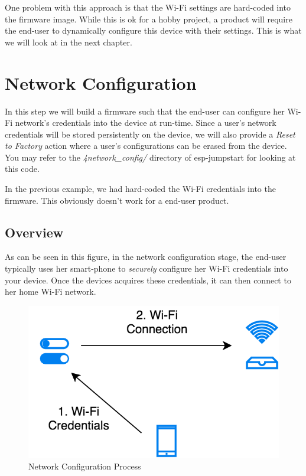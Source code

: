 \documentclass[11pt,fleqn]{book} %
\begin{document}
One problem with this approach is that the Wi-Fi settings are hard-coded into the firmware image. While this is ok for a hobby project, a product will require the end-user to dynamically configure this device with their settings. This is what we will look at in the next chapter.



\chapter{Network Configuration}

In this step we will build a firmware such that the end-user can configure her Wi-Fi network's credentials into the device at run-time. Since a user's network credentials will be stored persistently on the device, we will also provide a \textit{Reset to Factory} action where a user's configurations can be erased from the device.
You may refer to the \textit{4network\_config/} directory of esp-jumpstart for looking at this code.

In the previous example, we had hard-coded the Wi-Fi credentials into the firmware. This obviously doesn't work for a end-user product.

\section{Overview}
As can be seen in this figure, in the network configuration stage, the end-user typically uses her smart-phone to \textit{securely} configure her Wi-Fi credentials into your device. Once the devices acquires these credentials, it can then connect to her home Wi-Fi network. 

\begin{figure}
    \centering
    \includegraphics[scale=0.4]{Pictures/network_config.png}
    \caption{Network Configuration Process}
    \label{fig:network_config}
\end{figure}
\end{document}
